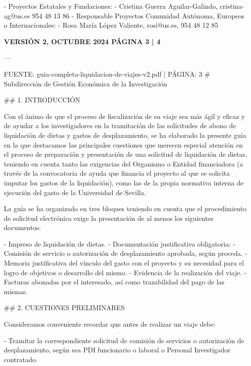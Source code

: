 \documentclass{article}
\begin{document}
\begin{itemize}
\begin{itemize}
\begin{scriptsize}
                  - Proyectos Estatales y Fundaciones:
                  - Cristina Guerra Aguilar-Galindo, cristina-ag@us.es 954 48 13 86
                  - Responsable Proyectos Comunidad Autónoma, Europeos o Internacionales:
                  - Rosa María López Valiente, rosi@us.es, 954 48 12 85

                  \textbf{VERSIÓN 2, OCTUBRE 2024        PÁGINA 3 | 4}

                  ---

                  FUENTE: guia-completa-liquidacion-de-viajes-v2.pdf | PÁGINA: 3
                  \# Subdirección de Gestión Económica de la Investigación

                  \#\# 1. INTRODUCCIÓN

                  Con el ánimo de que el proceso de fiscalización de su viaje sea más ágil y eficaz y de ayudar a los investigadores en la tramitación de las solicitudes de abono de liquidación de dietas y gastos de desplazamiento, se ha elaborado la presente guía en la que destacamos las principales cuestiones que merecen especial atención en el proceso de preparación y presentación de una solicitud de liquidación de dietas, teniendo en cuenta tanto las exigencias del Organismo o Entidad financiadora (a través de la convocatoria de ayuda que financia el proyecto al que se solicita imputar los gastos de la liquidación), como las de la propia normativa interna de ejecución del gasto de la Universidad de Sevilla.

                  La guía se ha organizado en tres bloques teniendo en cuenta que el procedimiento de solicitud electrónica exige la presentación de al menos los siguientes documentos:

                  - Impreso de liquidación de dietas.
                  - Documentación justificativa obligatoria:
                  - Comisión de servicio o autorización de desplazamiento aprobada, según proceda.
                  - Memoria justificativa del vínculo del gasto con el proyecto y su necesidad para el logro de objetivos o desarrollo del mismo.
                  - Evidencia de la realización del viaje.
                  - Facturas abonadas por el interesado, así como trazabilidad del pago de las mismas.

                  \#\# 2. CUESTIONES PRELIMINARES

                  Consideramos conveniente recordar que antes de realizar un viaje debe:

                  - Tramitar la correspondiente solicitud de comisión de servicios o autorización de desplazamiento, según sea PDI funcionario o laboral o Personal Investigador contratado.


\end{scriptsize}
\end{itemize}
\end{itemize}
\end{document}
